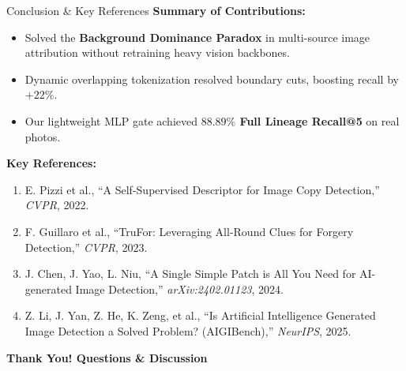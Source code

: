 \documentclass[xcolor=table]{beamer}
\begin{document}
\begin{frame}{Conclusion \& Key References}
  \textbf{Summary of Contributions:}
  \begin{itemize}
    \item Solved the \textbf{Background Dominance Paradox} in multi-source image attribution without retraining heavy vision backbones.
    \item Dynamic overlapping tokenization resolved boundary cuts, boosting recall by $+22\%$.
    \item Our lightweight MLP gate achieved \textbf{$88.89\%$ Full Lineage Recall@5} on real photos.
  \end{itemize}
  \vspace{0.15cm}
  \textbf{Key References:}
  \scriptsize
  \begin{enumerate}
    \item E. Pizzi et al., ``A Self-Supervised Descriptor for Image Copy Detection,'' \textit{CVPR}, 2022.
    \item F. Guillaro et al., ``TruFor: Leveraging All-Round Clues for Forgery Detection,'' \textit{CVPR}, 2023.
    \item J. Chen, J. Yao, L. Niu, ``A Single Simple Patch is All You Need for AI-generated Image Detection,'' \textit{arXiv:2402.01123}, 2024.
    \item Z. Li, J. Yan, Z. He, K. Zeng, et al., ``Is Artificial Intelligence Generated Image Detection a Solved Problem? (AIGIBench),'' \textit{NeurIPS}, 2025.
  \end{enumerate}
  \vspace{0.2cm}
  \centering
  \small \textbf{\textcolor{myblue}{Thank You! Questions \& Discussion}}
\end{frame}
\end{document}
